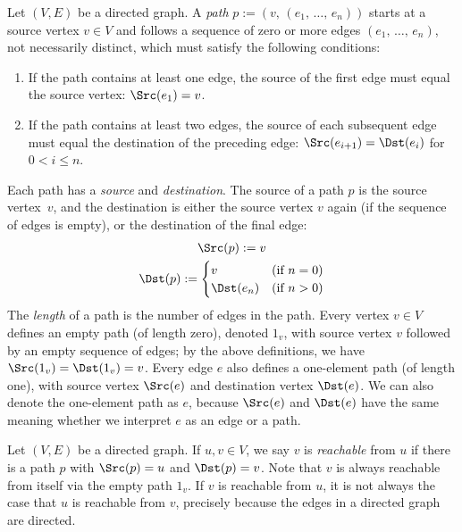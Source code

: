 \documentclass[../generics]{subfiles}
\begin{document}
\begin{definition}\label{digraph path}
Let $(V,E)$ be a directed graph. A \emph{path} $p := (v,\,(e_1,\,\ldots,\,e_n))$ starts at a source vertex $v\in V$ and follows a sequence of zero or more edges $(e_1,\,\ldots,\,e_n)$, not necessarily distinct, which must satisfy the following conditions:
\begin{enumerate}
\item If the path contains at least one edge, the source of the first edge must equal the source vertex: $\Src(e_1)=v$.
\item If the path contains at least two edges, the source of each subsequent edge must equal the destination of the preceding edge: $\Src(e_{i+1})=\Dst(e_i)$ for $0<i\leq n$.
\end{enumerate}
Each path has a \emph{source} and \emph{destination}. The source of a path $p$ is the source vertex~$v$, and the destination is either the source vertex $v$ again (if the sequence of edges is empty), or the destination of the final edge:
\begin{gather*}
\Src(p) := v\\
\Dst(p) := \begin{cases}
v&\text{(if $n=0$)}\\
\Dst(e_n)&\text{(if $n>0$)}
\end{cases}
\end{gather*}
The \emph{length} of a path is the number of edges in the path. Every vertex $v\in V$ defines an empty path (of length zero), denoted $1_v$, with source vertex $v$ followed by an empty sequence of edges; by the above definitions, we have $\Src(1_v)=\Dst(1_v)=v$. Every edge $e$ also defines a one-element path (of length one), with source vertex $\Src(e)$ and destination vertex $\Dst(e)$. We can also denote the one-element path as $e$, because $\Src(e)$ and $\Dst(e)$ have the same meaning whether we interpret $e$ as an edge or a path.
\end{definition}

\begin{definition}
Let $(V, E)$ be a directed graph. If $u,v\in V$, we say $v$ is \emph{reachable} from $u$ if there is a path $p$ with $\Src(p)=u$ and $\Dst(p)=v$. Note that $v$ is always reachable from itself via the empty path $1_v$. If $v$ is reachable from $u$, it is not always the case that $u$ is reachable from $v$, precisely because the edges in a directed graph are directed.
\end{definition}
\end{document}

